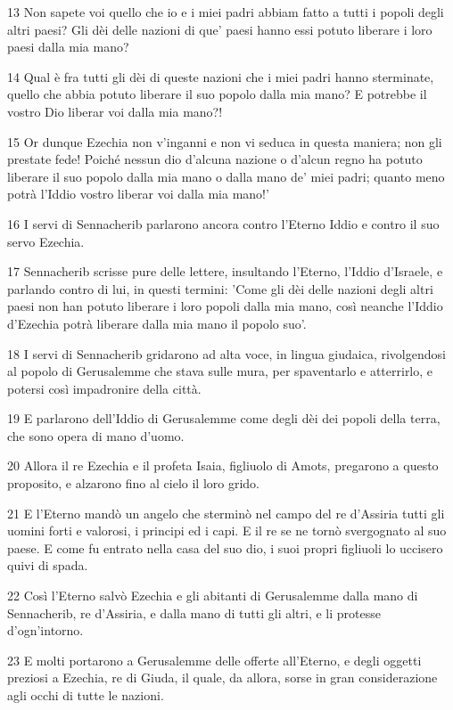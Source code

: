 \par 13 Non sapete voi quello che io e i miei padri abbiam fatto a tutti i popoli degli altri paesi? Gli dèi delle nazioni di que' paesi hanno essi potuto liberare i loro paesi dalla mia mano?
\par 14 Qual è fra tutti gli dèi di queste nazioni che i miei padri hanno sterminate, quello che abbia potuto liberare il suo popolo dalla mia mano? E potrebbe il vostro Dio liberar voi dalla mia mano?!
\par 15 Or dunque Ezechia non v'inganni e non vi seduca in questa maniera; non gli prestate fede! Poiché nessun dio d'alcuna nazione o d'alcun regno ha potuto liberare il suo popolo dalla mia mano o dalla mano de' miei padri; quanto meno potrà l'Iddio vostro liberar voi dalla mia mano!'
\par 16 I servi di Sennacherib parlarono ancora contro l'Eterno Iddio e contro il suo servo Ezechia.
\par 17 Sennacherib scrisse pure delle lettere, insultando l'Eterno, l'Iddio d'Israele, e parlando contro di lui, in questi termini: 'Come gli dèi delle nazioni degli altri paesi non han potuto liberare i loro popoli dalla mia mano, così neanche l'Iddio d'Ezechia potrà liberare dalla mia mano il popolo suo'.
\par 18 I servi di Sennacherib gridarono ad alta voce, in lingua giudaica, rivolgendosi al popolo di Gerusalemme che stava sulle mura, per spaventarlo e atterrirlo, e potersi così impadronire della città.
\par 19 E parlarono dell'Iddio di Gerusalemme come degli dèi dei popoli della terra, che sono opera di mano d'uomo.
\par 20 Allora il re Ezechia e il profeta Isaia, figliuolo di Amots, pregarono a questo proposito, e alzarono fino al cielo il loro grido.
\par 21 E l'Eterno mandò un angelo che sterminò nel campo del re d'Assiria tutti gli uomini forti e valorosi, i principi ed i capi. E il re se ne tornò svergognato al suo paese. E come fu entrato nella casa del suo dio, i suoi propri figliuoli lo uccisero quivi di spada.
\par 22 Così l'Eterno salvò Ezechia e gli abitanti di Gerusalemme dalla mano di Sennacherib, re d'Assiria, e dalla mano di tutti gli altri, e li protesse d'ogn'intorno.
\par 23 E molti portarono a Gerusalemme delle offerte all'Eterno, e degli oggetti preziosi a Ezechia, re di Giuda, il quale, da allora, sorse in gran considerazione agli occhi di tutte le nazioni.
